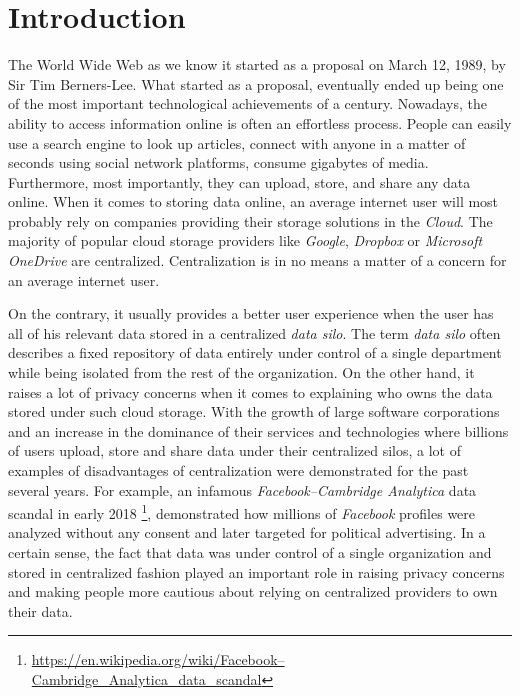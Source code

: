 \chapter*{Introduction}
\label{chap:introduction}

The World Wide Web as we know it started as a proposal on March 12, 1989, by Sir Tim Berners-Lee. What started as a proposal, eventually ended up being one of the most important technological achievements of a century. Nowadays, the ability to access information online is often an effortless process. People can easily use a search engine to look up articles, connect with anyone in a matter of seconds using social network platforms, consume gigabytes of media. Furthermore, most importantly, they can upload, store, and share any data online. When it comes to storing data online, an average internet user will most probably rely on companies providing their storage solutions in the \textit{Cloud}. The majority of popular cloud storage providers like \textit{Google}, \textit{Dropbox} or \textit{Microsoft OneDrive} are centralized. Centralization is in no means a matter of a concern for an average internet user.

On the contrary, it usually provides a better user experience when the user has all of his relevant data stored in a centralized \textit{data silo}. The term \textit{data silo} often describes a fixed repository of data entirely under control of a single department while being isolated from the rest of the organization. On the other hand, it raises a lot of privacy concerns when it comes to explaining who owns the data stored under such cloud storage. With the growth of large software corporations and an increase in the dominance of their services and technologies where billions of users upload, store and share data under their centralized silos, a lot of examples of disadvantages of centralization were demonstrated for the past several years. For example, an infamous \textit{Facebook–Cambridge Analytica} data scandal in early 2018 \footnote{\url{https://en.wikipedia.org/wiki/Facebook–Cambridge_Analytica_data_scandal}}, demonstrated how millions of \textit{Facebook} profiles were analyzed without any consent and later targeted for political advertising. In a certain sense, the fact that data was under control of a single organization and stored in centralized fashion played an important role in raising privacy concerns and making people more cautious about relying on centralized providers to own their data.

